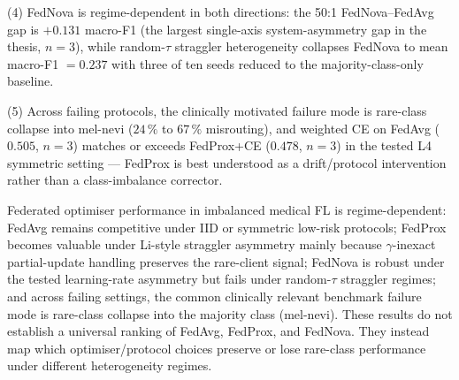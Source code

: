 (4) FedNova is regime-dependent in both directions: the 50:1 FedNova--FedAvg
gap is $+0.131$ macro-F1 (the largest single-axis system-asymmetry gap in
the thesis, $n=3$), while random-$\tau$ straggler heterogeneity collapses
FedNova to mean macro-F1 $= 0.237$ with three of ten seeds reduced to the
majority-class-only baseline.

(5) Across failing protocols, the clinically motivated failure mode is
rare-class collapse into mel-nevi ($24\,\%$ to $67\,\%$ misrouting), and
weighted CE on FedAvg ($0.505$, $n=3$) matches or exceeds FedProx+CE
($0.478$, $n=3$) in the tested L4 symmetric setting --- FedProx is best
understood as a drift/protocol intervention rather than a class-imbalance
corrector.

Federated optimiser performance in imbalanced medical FL is regime-dependent:
FedAvg remains competitive under IID or symmetric low-risk protocols;
FedProx becomes valuable under Li-style straggler asymmetry mainly because
$\gamma$-inexact partial-update handling preserves the rare-client signal;
FedNova is robust under the tested learning-rate asymmetry but fails under
random-$\tau$ straggler regimes; and across failing settings, the common
clinically relevant benchmark failure mode is rare-class collapse into the
majority class (mel-nevi). These results do not establish a universal ranking of FedAvg,
FedProx, and FedNova. They instead map which optimiser/protocol choices
preserve or lose rare-class performance under different heterogeneity
regimes.



